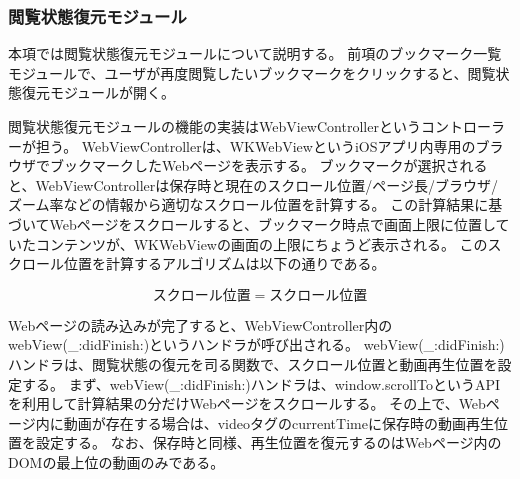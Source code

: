 \subsubsection{閲覧状態復元モジュール}
\label{sec:impl-client-ios-restore-module}

本項では閲覧状態復元モジュールについて説明する。
前項のブックマーク一覧モジュールで、ユーザが再度閲覧したいブックマークをクリックすると、閲覧状態復元モジュールが開く。

閲覧状態復元モジュールの機能の実装はWebViewControllerというコントローラーが担う。
WebViewControllerは、WKWebViewというiOSアプリ内専用のブラウザでブックマークしたWebページを表示する。
ブックマークが選択されると、WebViewControllerは保存時と現在のスクロール位置/ページ長/ブラウザ/ズーム率などの情報から適切なスクロール位置を計算する。
この計算結果に基づいてWebページをスクロールすると、ブックマーク時点で画面上限に位置していたコンテンツが、WKWebViewの画面の上限にちょうど表示される。
このスクロール位置を計算するアルゴリズムは以下の通りである。

\begin{equation}
スクロール位置 = スクロール位置
\end{equation}

Webページの読み込みが完了すると、WebViewController内のwebView(\_:didFinish:)\cite{didFinish}というハンドラが呼び出される。
webView(\_:didFinish:)ハンドラは、閲覧状態の復元を司る関数で、スクロール位置と動画再生位置を設定する。
まず、webView(\_:didFinish:)ハンドラは、window.scrollToというAPIを利用して計算結果の分だけWebページをスクロールする。
その上で、Webページ内に動画が存在する場合は、videoタグのcurrentTimeに保存時の動画再生位置を設定する。
なお、保存時と同様、再生位置を復元するのはWebページ内のDOMの最上位の動画のみである。

